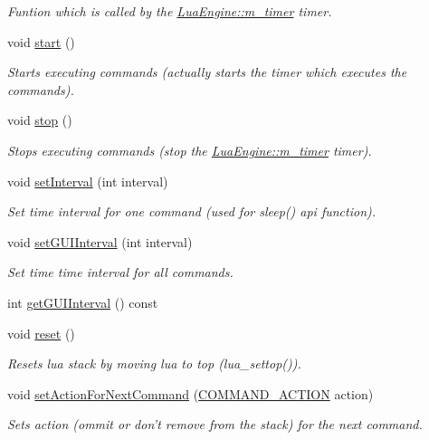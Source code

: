 \begin{DoxyCompactItemize}
\begin{DoxyCompactList}\small\item\em Funtion which is called by the \hyperlink{class_lua_engine_a367284a1461c5a2d2804c3f9b4d94f14}{Lua\-Engine\-::m\-\_\-timer} timer. \end{DoxyCompactList}\item 
void \hyperlink{class_lua_engine_a28e0795b54170d763a929256566fe2b5}{start} ()
\begin{DoxyCompactList}\small\item\em Starts executing commands (actually starts the timer which executes the commands). \end{DoxyCompactList}\item 
void \hyperlink{class_lua_engine_a5822af655fb7b474766e39b44be56a6a}{stop} ()
\begin{DoxyCompactList}\small\item\em Stops executing commands (stop the \hyperlink{class_lua_engine_a367284a1461c5a2d2804c3f9b4d94f14}{Lua\-Engine\-::m\-\_\-timer} timer). \end{DoxyCompactList}\item 
void \hyperlink{class_lua_engine_a0b87a8b474070665af6e435a2c5bce56}{set\-Interval} (int interval)
\begin{DoxyCompactList}\small\item\em Set time interval for one command (used for sleep() api function). \end{DoxyCompactList}\item 
void \hyperlink{class_lua_engine_ac29f2b09b45797aac68bd5caa6fe2c90}{set\-G\-U\-I\-Interval} (int interval)
\begin{DoxyCompactList}\small\item\em Set time time interval for all commands. \end{DoxyCompactList}\item 
int \hyperlink{class_lua_engine_a613b53ffedc45c8cf800e99aa42408c5}{get\-G\-U\-I\-Interval} () const 
\item 
void \hyperlink{class_lua_engine_ab598de2b82cdf3ea3c67244669a31194}{reset} ()
\begin{DoxyCompactList}\small\item\em Resets lua stack by moving lua to top (lua\-\_\-settop()). \end{DoxyCompactList}\item 
void \hyperlink{class_lua_engine_ac0cfa803159af14022cb08a7442f288b}{set\-Action\-For\-Next\-Command} (\hyperlink{class_lua_engine_a3410f0b2ab8ca7641b79653451490d90}{C\-O\-M\-M\-A\-N\-D\-\_\-\-A\-C\-T\-I\-O\-N} action)
\begin{DoxyCompactList}\small\item\em Sets action (ommit or don't remove from the stack) for the next command. \end{DoxyCompactList}\end{DoxyCompactItemize}
